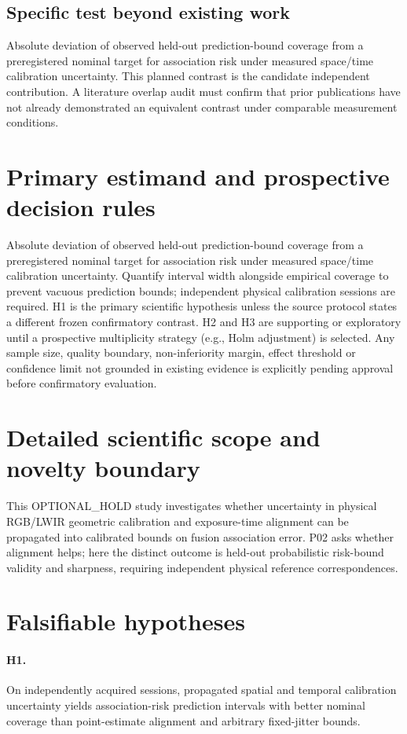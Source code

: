\documentclass[11pt,a4paper]{article}
\begin{document}
\subsection{Specific test beyond existing work}
Absolute deviation of observed held-out prediction-bound coverage from a preregistered nominal target for association risk under measured space/time calibration uncertainty. This planned contrast is the candidate independent contribution. A literature overlap audit must confirm that prior publications have not already demonstrated an equivalent contrast under comparable measurement conditions.

\section{Primary estimand and prospective decision rules}
Absolute deviation of observed held-out prediction-bound coverage from a preregistered nominal target for association risk under measured space/time calibration uncertainty. Quantify interval width alongside empirical coverage to prevent vacuous prediction bounds; independent physical calibration sessions are required. H1 is the primary scientific hypothesis unless the source protocol states a different frozen confirmatory contrast. H2 and H3 are supporting or exploratory until a prospective multiplicity strategy (e.g., Holm adjustment) is selected. Any sample size, quality boundary, non-inferiority margin, effect threshold or confidence limit not grounded in existing evidence is explicitly pending approval before confirmatory evaluation.

\section{Detailed scientific scope and novelty boundary}
This OPTIONAL\_HOLD study investigates whether uncertainty in physical RGB/LWIR geometric calibration and exposure-time alignment can be propagated into calibrated bounds on fusion association error. P02 asks whether alignment helps; here the distinct outcome is held-out probabilistic risk-bound validity and sharpness, requiring independent physical reference correspondences.

\section{Falsifiable hypotheses}
\paragraph{H1.} On independently acquired sessions, propagated spatial and temporal calibration uncertainty yields association-risk prediction intervals with better nominal coverage than point-estimate alignment and arbitrary fixed-jitter bounds.
\end{document}
